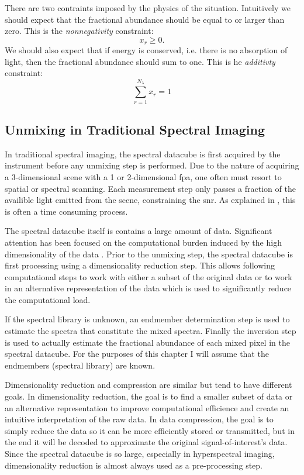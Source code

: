 There are two contraints imposed by the physics of the situation. Intuitively we should expect that the fractional abundance should be equal to or larger than zero. This is the \emph{nonnegativity} constraint:
%
\begin{equation}
	x_r \geq 0.
\end{equation}
%
We should also expect that if energy is conserved, i.e. there is no absorption of light, then the \gls{fractional abundance} should sum to one. This is he \emph{additivty} constraint:
%
\begin{equation}
	\sum_{r = 1}^{N_{\lambda}} x_r = 1
\end{equation}


\subsection{Unmixing in Traditional Spectral Imaging}

In traditional spectral imaging, the spectral datacube is first acquired by the instrument before any unmixing step is performed. Due to the nature of acquiring a 3-dimensional scene with a 1 or 2-dimensional \gls{fpa}, one often must resort to spatial or spectral scanning. Each measurement step only passes a fraction of the availible light emitted from the scene, constraining the \gls{snr}. As explained in , this is often a time consuming process. 

The spectral datacube itself is contains a large amount of data. Significant attention has been focused on the computational burden induced by the high dimensionality of the data \cite{keshava2002spectral, keshava2003survey}. Prior to the unmixing step, the spectral datacube is first processing using a \gls{dimensionality reduction} step. This allows following computational steps to work with either a subset of the original data or to work in an alternative representation of the data which is used to significantly reduce the computational load.

If the spectral library is unknown, an \gls{endmember determination} step is used to estimate the spectra that constitute the mixed spectra. Finally the \gls{inversion} step is used to actually estimate the \gls{fractional abundance} of each mixed pixel in the spectral datacube. For the purposes of this chapter I will assume that the endmembers (spectral library) are known.


Dimensionality reduction and compression are similar but tend to have different goals. In dimensionality reduction, the goal is to find a smaller subset of data or an alternative representation to improve computational efficience and create an intuitive interpretation of the raw data. In data compression, the goal is to simply reduce the data so it can be more efficiently stored or transmitted, but in the end it will be decoded to approximate the original signal-of-interest's data. Since the spectral datacube is so large, especially in hyperspectral imaging, dimensionality reduction is almost always used as a pre-processing step. 

